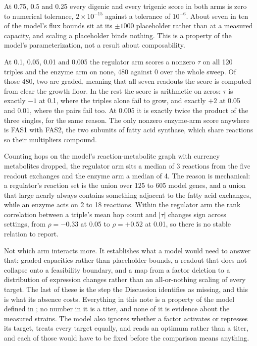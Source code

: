  At 0.75, 0.5 and
0.25 every digenic and every trigenic score in both arms is zero to numerical tolerance,
$2 \times 10^{-15}$ against a tolerance of $10^{-6}$. About seven in
ten of the model's flux bounds sit at its $\pm 1000$ placeholder rather than at a measured
capacity, and scaling a placeholder binds nothing. This is a property of the model's
parameterization, not a result about composability.

 At 0.1, 0.05,
0.01 and 0.005 the regulator arm scores a nonzero $\tau$ on all 120 triples and the enzyme
arm on none, 480 against 0 over the whole sweep. Of those 480, two are graded, meaning
that all seven readouts the score is computed from clear the growth floor. In the rest the
score is arithmetic on zeros: $\tau$ is exactly $-1$ at 0.1, where the triples alone fail
to grow, and exactly $+2$ at 0.05 and 0.01, where the pairs fail too. At 0.005 it is
exactly twice the product of the three singles, for the same reason. The only nonzero
enzyme-arm score anywhere is FAS1 with FAS2, the two subunits of fatty acid synthase,
which share reactions so their multipliers compound.

 Counting hops on the
model's reaction-metabolite graph with currency metabolites dropped, the regulator arm
sits a median of 3 reactions from the five readout exchanges and the enzyme arm a median
of 4. The reason is mechanical: a regulator's reaction set is the union over 125 to 605
model genes, and a union that large nearly always contains something adjacent to the fatty
acid exchanges, while an enzyme acts on 2 to 18 reactions. Within
the regulator arm the rank correlation between a triple's mean hop count and $|\tau|$
changes sign across settings, from $\rho = -0.33$ at 0.05 to $\rho = +0.52$ at 0.01, so
there is no stable relation to report.

 Not which arm interacts more. It establishes what a model
would need to answer that: graded capacities rather than placeholder bounds, a readout
that does not collapse onto a feasibility boundary, and a map from a factor deletion to a
distribution of expression changes rather than an all-or-nothing scaling of every target.
The last of these is the step the Discussion identifies as missing, and this is what its
absence costs. Everything in this note is a property of the model defined in
; no
number in it is a titer, and none of it is evidence about the measured strains. The model
also ignores whether a factor activates or represses its target, treats every target
equally, and reads an optimum rather than a titer, and each of those would have to be
fixed before the comparison means anything.

